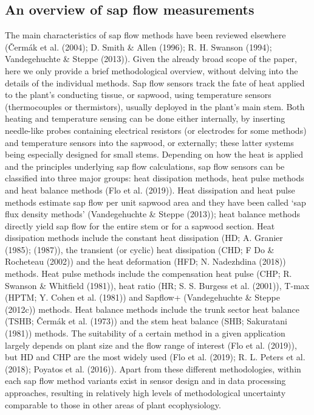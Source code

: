 \documentclass[11pt,twoside]{reedthesis}
\begin{document}
\subsection{An overview of sap flow
measurements}\label{an-overview-of-sap-flow-measurements}

The main characteristics of sap flow methods have been reviewed
elsewhere (Čermák et al. (2004); D. Smith \& Allen (1996); R. H. Swanson
(1994); Vandegehuchte \& Steppe (2013)). Given the already broad scope
of the paper, here we only provide a brief methodological overview,
without delving into the details of the individual methods. Sap flow
sensors track the fate of heat applied to the plant's conducting tissue,
or sapwood, using temperature sensors (thermocouples or thermistors),
usually deployed in the plant's main stem. Both heating and temperature
sensing can be done either internally, by inserting needle-like probes
containing electrical resistors (or electrodes for some methods) and
temperature sensors into the sapwood, or externally; these latter
systems being especially designed for small stems. Depending on how the
heat is applied and the principles underlying sap flow calculations, sap
flow sensors can be classified into three major groups: heat dissipation
methods, heat pulse methods and heat balance methods (Flo et al.
(2019)). Heat dissipation and heat pulse methods estimate sap flow per
unit sapwood area and they have been called `sap flux density methods'
(Vandegehuchte \& Steppe (2013)); heat balance methods directly yield
sap flow for the entire stem or for a sapwood section. Heat dissipation
methods include the constant heat dissipation (HD; A. Granier (1985);
(1987)), the transient (or cyclic) heat dissipation (CHD; F Do \&
Rocheteau (2002)) and the heat deformation (HFD; N. Nadezhdina (2018))
methods. Heat pulse methods include the compensation heat pulse (CHP; R.
Swanson \& Whitfield (1981)), heat ratio (HR; S. S. Burgess et al.
(2001)), T-max (HPTM; Y. Cohen et al. (1981)) and Sapflow+
(Vandegehuchte \& Steppe (2012c)) methods. Heat balance methods include
the trunk sector heat balance (TSHB; Čermák et al. (1973)) and the stem
heat balance (SHB; Sakuratani (1981)) methods. The suitability of a
certain method in a given application largely depends on plant size and
the flow range of interest (Flo et al. (2019)), but HD and CHP are the
most widely used (Flo et al. (2019); R. L. Peters et al. (2018); Poyatos
et al. (2016)). Apart from these different methodologies, within each
sap flow method variants exist in sensor design and in data processing
approaches, resulting in relatively high levels of methodological
uncertainty comparable to those in other areas of plant
ecophysiology.\par
\end{document}
